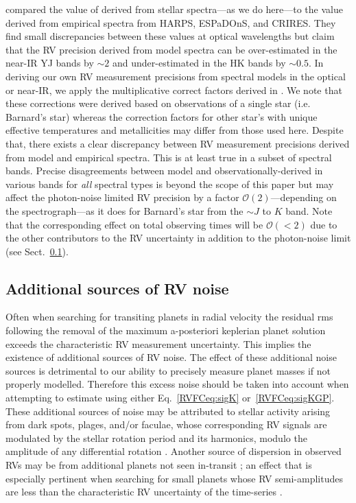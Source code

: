 \cite{artigau18} compared the value of \sigRV{} derived from stellar spectra---as we do
here---to the value derived from empirical spectra from HARPS, ESPaDOnS, and CRIRES. They find
small discrepancies between these values at optical wavelengths but claim that the RV precision
derived from model spectra can be over-estimated in the near-IR YJ bands by $\sim 2$ and 
under-estimated in the HK bands by $\sim 0.5$. In deriving our own RV measurement precisions
from spectral models in the optical or near-IR, we apply the multiplicative correct factors
derived in \cite{artigau18}. We note that these corrections were derived based on observations
of a single star (i.e. Barnard's star) whereas the correction factors for other star's with
unique effective temperatures and metallicities may differ from those used here.
Despite that, there exists a clear discrepancy between RV measurement precisions derived
from model and empirical spectra. This is at least true in a subset of spectral bands.
Precise disagreements between model and observationally-derived \sigRV{} in various
bands for \emph{all} spectral types is beyond the scope of this paper but may affect the
photon-noise limited RV precision by a factor $\mathcal{O}(2)$---depending on the
spectrograph---as it does for Barnard's star from the $\sim J$ to $K$ band. Note that the
corresponding effect on total observing times will be $\mathcal{O}(<2)$ due to 
the other contributors to the RV uncertainty in addition to the photon-noise limit (see
Sect.~\ref{RVFCsect:noise}). \\

\subsection{Additional sources of RV noise} \label{RVFCsect:noise}
Often when searching for transiting planets in radial velocity the residual rms following the
removal of the maximum a-posteriori keplerian planet
solution exceeds the characteristic RV measurement uncertainty.
This implies the existence of additional sources of RV noise.
The effect of these additional noise sources is detrimental to our ability to
precisely measure planet masses if not properly modelled. Therefore this excess noise should be taken into
account when attempting to estimate \sigK{} using either Eq.~\ref{RVFCeq:sigK} or~\ref{RVFCeq:sigKGP}.
These additional sources of noise may be
attributed to stellar activity arising from dark spots, plages, and/or faculae, whose corresponding RV
signals are modulated by the stellar rotation period and its harmonics, modulo the amplitude of any differential
rotation \citep[e.g.][]{forveille09, bonfils13, delfosse13b}.
Another source of dispersion in observed RVs may be
from additional planets not seen in-transit \citep[e.g.][]{christiansen17, cloutier17b, bonfils18};
an effect that is especially pertinent when searching for small planets whose RV semi-amplitudes are
less than the characteristic RV uncertainty of the time-series \citep[e.g.][]{astudillodefru17a}. \\

